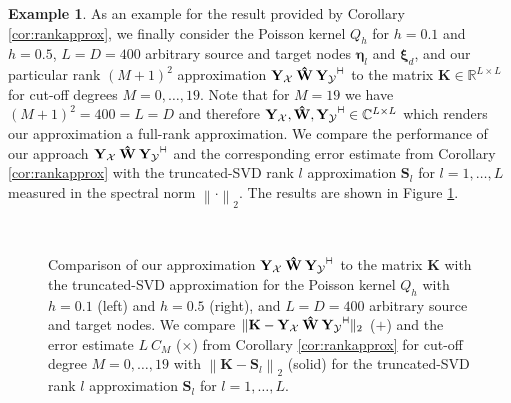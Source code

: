 \documentclass[11pt,a4paper,twoside,bibtotoc]{scrartcl}
\theoremstyle{plain}
\theoremstyle{definition}
\newtheorem{example}[theorem]{Example}
\theoremstyle{remark}
\newcommand{\R}{\ensuremath{\mathbb{R}}}
\newcommand{\C}{\ensuremath{\mathbb{C}}}
\newcommand{\adj}{{\vdash \hspace*{-1.72mm} \dashv}}
\numberwithin{equation}{section}
\numberwithin{table}{section}
\numberwithin{figure}{section}
\begin{document}
\begin{example}
As an example for the result provided by Corollary \ref{cor:rankapprox}, we 
finally consider the Poisson kernel $Q_{h}$ for 
$h = 0.1$ and $h=0.5$, $L=D=400$ arbitrary source and target nodes $\mathbf{\eta}_{l}$ and $\mathbf{\xi}_{d}$,
and our particular rank $(M+1)^2$ approximation 
$\mathbf{Y_{\mathcal{X}}} \: \mathbf{\hat W} \: \mathbf{Y_{\mathcal{Y}}}^{\adj}$ to the matrix $\mathbf{K} \in \R^{L \times L}$ 
for cut-off degrees $M=0,\ldots,19$. Note that for $M=19$ we 
have $(M+1)^2 = 400 = L = D$ and therefore $\mathbf{Y_{\mathcal{X}}}, \mathbf{\hat W}, 
\mathbf{Y_{\mathcal{Y}}}^{\adj} \in \C^{L \times L}$ which renders our approximation a full-rank 
approximation. We compare the performance of our approach $\mathbf{Y_{\mathcal{X}}} \: \mathbf{\hat W} \: 
\mathbf{Y_{\mathcal{Y}}}^{\adj}$ and the corresponding error estimate from Corollary \ref{cor:rankapprox}
with the truncated-SVD rank $l$ approximation $\mathbf{S}_{l}$ for $l = 1,\ldots,L$
measured in the spectral norm $\left\|\cdot\right\|_{2}$. The results are shown in Figure \ref{fig:rankapprox}. 
 
\end{example}

\begin{figure}[tb]
  \centering
  \hfill
  \\
  \caption{Comparison of our approximation $\mathbf{Y_{\mathcal{X}}} \: \mathbf{\hat W} \: 
  \mathbf{Y_{\mathcal{Y}}}^{\adj}$ to the matrix $\mathbf{K}$ with the truncated-SVD approximation
  for the Poisson kernel $Q_{h}$ with $h=0.1$ (left) and $h=0.5$ (right), 
  and $L = D = 400$ arbitrary source and target nodes. 
  We compare 
  $\|\mathbf{K} - \mathbf{Y_{\mathcal{X}}} \: \mathbf{\hat W} \: \mathbf{Y_{\mathcal{Y}}}^{\adj}\|_{2}$ 
  ($+$) and the error estimate $L \: C_{M}$ ($\times$) from Corollary \ref{cor:rankapprox} 
  for cut-off degree $M=0,\ldots,19$ with 
  $\left\|\mathbf{K} - \mathbf{S}_{l}\right\|_{2}$ (solid) for 
  the truncated-SVD rank $l$ approximation $\mathbf{S}_{l}$ for $l=1,\ldots,L$.
  }
  \label{fig:rankapprox}
\end{figure}
\end{document}
